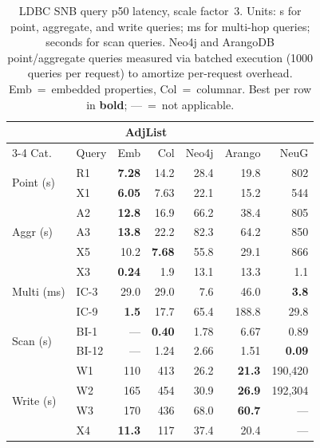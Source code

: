 \begin{table}[h]
  \centering
  \setlength{\tabcolsep}{3pt}
  \begin{tabular*}{\columnwidth}{@{\extracolsep{\fill}}ll rrrrr@{}}
    \toprule
    & & \multicolumn{2}{c}{\project{} AdjList} & & & \\
    \cmidrule(lr){3-4}
    Cat. & Query & Emb & Col & Neo4j & Arango & NeuG \\
    \midrule
    \multirow{2}{*}{Point (\textmu{}s)}
    & R1   & \textbf{7.28}  & 14.2  & 28.4  & 19.8  & 802 \\
    & X1   & \textbf{6.05}  & 7.63  & 22.1  & 15.2  & 544 \\
    \midrule
    \multirow{3}{*}{Aggr (\textmu{}s)}
    & A2   & \textbf{12.8}  & 16.9  & 66.2  & 38.4  & 805 \\
    & A3   & \textbf{13.8}  & 22.2  & 82.3  & 64.2  & 850 \\
    & X5   & 10.2  & \textbf{7.68}  & 55.8  & 29.1  & 866 \\
    \midrule
    \multirow{3}{*}{Multi (ms)}
    & X3   & \textbf{0.24}  & 1.9  & 13.1  & 13.3  & 1.1 \\
    & IC-3   & 29.0  & 29.0  & 7.6  & 46.0  & \textbf{3.8} \\
    & IC-9   & \textbf{1.5}  & 17.7  & 65.4  & 188.8  & 29.8 \\
    \midrule
    \multirow{2}{*}{Scan (s)}
    & BI-1   & ---  & \textbf{0.40}  & 1.78  & 6.67  & 0.89 \\
    & BI-12   & ---  & 1.24  & 2.66  & 1.51  & \textbf{0.09} \\
    \midrule
    \multirow{4}{*}{Write (\textmu{}s)}
    & W1   & 110  & 413  & 26.2  & \textbf{21.3}  & 190{,}420 \\
    & W2   & 165  & 454  & 30.9  & \textbf{26.9}  & 192{,}304 \\
    & W3   & 170  & 436  & 68.0  & \textbf{60.7}  & --- \\
    & X4   & \textbf{11.3}  & 117  & 37.4  & 20.4  & --- \\
    \bottomrule
  \end{tabular*}
  \caption{LDBC SNB query p50 latency, scale factor~3.
    Units: \textmu{}s for point, aggregate, and write queries;
    ms for multi-hop queries; seconds for scan queries.
    Neo4j and ArangoDB point/aggregate queries measured via batched execution
    (1000 queries per request) to amortize per-request overhead.
    Emb~=~embedded properties, Col~=~columnar.
    Best per row in \textbf{bold}; ---~=~not applicable.}
  \label{tab:ldbc-queries}
\end{table}

